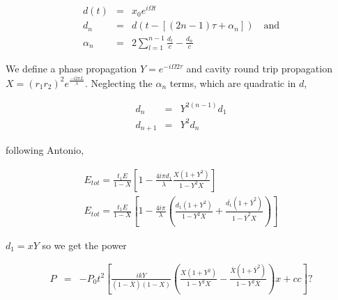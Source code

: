 \begin{eqnarray}
\label{e:dn}
d(t) &=& x_0 e^{i\Omega t}\nonumber\\
d_n &=& d(t-[(2n-1)\tau + \alpha_n ]) \quad \mbox{and}\\
\label{e:an}
\alpha_n &=& 2\sum\limits_{l=1}^{n-1}\frac{d_l}{c}-\frac{d_n}{c}
\end{eqnarray}

We define a phase propagation $Y=e^{-i\Omega 2\tau}$ and cavity round trip propagation $X=(r_1r_2)^2 e^{\frac{-i2\pi L}{\lambda}}$. Neglecting the $\alpha_n$ terms, which are quadratic in $d$,

\begin{eqnarray}
\label{e:dnY}
d_n &=& Y^{2(n-1)}d_1\\
d_{n+1} &=& Y^2d_n\nonumber
\end{eqnarray}

following Antonio,

\begin{eqnarray}
\label{e:Etot}
E_{tot} = \frac{t_1 E}{1-X}\left[ 1- \frac{4i\pi d_1}{\lambda}\frac{X(1+Y^2)}{1-Y^2X}\right]\nonumber\\
E_{tot} = \frac{t_1 E}{1-X}\left[ 1- \frac{4i\pi}{\lambda}\left(\frac{ d_1(1+Y^2)}{1-Y^2X}+\frac{ \overline{d_1}(1+\overline{Y}^2)}{1-\overline{Y}^2X}\right)\right]
\end{eqnarray}

$d_1 = xY$ so we get the power 

\begin{eqnarray}
\label{e:P}
P &=&-P_0t^2 \left[ \frac{ikY}{(1-\overline{X})(1-X)} \left( \frac{X(1+Y^2)}{1-Y^2 X}-\frac{\overline{X}(1+\overline{Y}^2)}{1-Y^2\overline{X}} \right) x + cc \right]?
\end{eqnarray}



